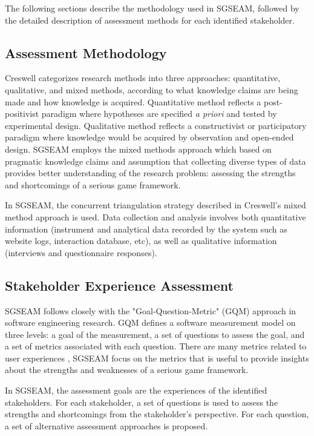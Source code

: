 \documentclass[11pt]{article}
\begin{document}
The following sections describe the methodology used in SGSEAM, followed by the detailed
description of assessment methods for each identified stakeholder.

\subsection{Assessment Methodology}
Creswell \cite{creswell2003} categorizes research methods into three approaches:
quantitative, qualitative, and mixed methods, according to what knowledge claims are being made
and how knowledge is acquired. Quantitative method reflects a post-positivist paradigm where
hypotheses are specified {\em a priori} and tested by experimental design. Qualitative method
reflects a constructivist or participatory paradigm where knowledge would be acquired by
observation and open-ended design. SGSEAM employs the mixed methods approach which based on
pragmatic knowledge claims and assumption that collecting diverse types of data provides better
understanding of the research problem: assessing the strengths and shortcomings of a serious game
framework.

In SGSEAM, the concurrent triangulation strategy described in Creswell's mixed method approach
is used.  Data collection and analysis involves both quantitative information (instrument and
analytical data recorded by the system such as website logs, interaction database, etc), as well
as qualitative information (interviews and questionnaire responses).

\subsection{Stakeholder Experience Assessment}

SGSEAM follows closely with the "Goal-Question-Metric" (GQM) approach \cite{caldiera1994goal} in
software engineering research. GQM defines a software  measurement model on three levels: a goal
of the measurement, a set of questions to assess the goal, and a set of metrics associated with
each question. There are many metrics related to user experiences \cite{tullis2010measuring}, SGSEAM
focus on the metrics that is useful to provide insights about the strengths and weaknesses of a serious
game framework.

In SGSEAM, the assessment goals are the experiences of the identified stakeholders. For each
stakeholder, a set of questions is used to assess the strengths and shortcomings from the
stakeholder's perspective. For each question, a set of alternative assessment approaches is
proposed.
\end{document}
